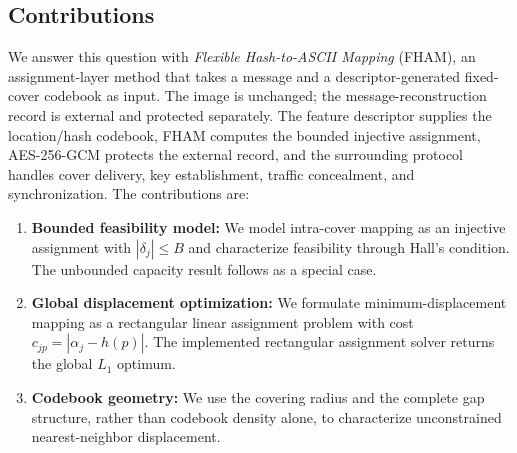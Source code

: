 \documentclass[preprint,12pt]{elsarticle}
\theoremstyle{plain}
\begin{document}
\subsection{Contributions}
We answer this question with \textit{Flexible Hash-to-ASCII Mapping} (FHAM), an assignment-layer method that takes a message and a descriptor-generated fixed-cover codebook as input. The image is unchanged; the message-reconstruction record is external and protected separately. The feature descriptor supplies the location/hash codebook, FHAM computes the bounded injective assignment, AES-256-GCM protects the external record, and the surrounding protocol handles cover delivery, key establishment, traffic concealment, and synchronization. The contributions are:
\begin{enumerate}
    \item \textbf{Bounded feasibility model:} We model intra-cover mapping as an injective assignment with $|\delta_j|\leq B$ and characterize feasibility through Hall's condition. The unbounded capacity result follows as a special case.

    \item \textbf{Global displacement optimization:} We formulate minimum-displacement mapping as a rectangular linear assignment problem with cost $c_{jp}=|\alpha_j-h(p)|$. The implemented rectangular assignment solver returns the global $L_1$ optimum.

    \item \textbf{Codebook geometry:} We use the covering radius and the complete gap structure, rather than codebook density alone, to characterize unconstrained nearest-neighbor displacement.


\end{enumerate}
\end{document}
